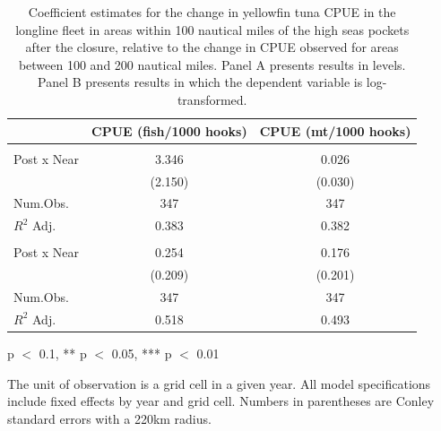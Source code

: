 \begin{table}
\centering
\begin{threeparttable}
\small
\caption{\label{tab:h3_reg_yft_ll}Coefficient estimates for the change in yellowfin tuna CPUE in the longline fleet in
             areas within 100 nautical miles of the high seas pockets after the closure, relative to the change in CPUE
             observed for areas between 100 and 200 nautical miles.
             Panel A presents results in levels. Panel B presents results in which the dependent variable is log-transformed.}
\centering
\begin{tabular}[t]{lcc}
\toprule
  & CPUE (fish/1000 hooks) & CPUE (mt/1000 hooks)\\
\midrule
\addlinespace[0.5em]
\multicolumn{3}{l}{\textit{A) Levels}}\\
\midrule \hspace{1em}Post x Near & 3.346 & 0.026\\
\hspace{1em} & (2.150) & (0.030)\\
\hspace{1em}Num.Obs. & 347 & \vphantom{1} 347\\
\hspace{1em}$R^2$ Adj. & 0.383 & 0.382\\
\addlinespace[0.5em]
\multicolumn{3}{l}{\textit{B) Log-transformed}}\\
\midrule \hspace{1em}Post x Near & 0.254 & 0.176\\
\hspace{1em} & (0.209) & (0.201)\\
\hspace{1em}Num.Obs. & 347 & 347\\
\hspace{1em}$R^2$ Adj. & 0.518 & 0.493\\
\bottomrule
\end{tabular}
\begin{tablenotes}
\small
\item * p $<$ 0.1, ** p $<$ 0.05, *** p $<$ 0.01
\item The unit of observation is a grid cell in a given year. All model specifications include fixed effects by year and grid cell. Numbers in parentheses are Conley standard errors with a 220km radius.
\end{tablenotes}
\end{threeparttable}
\end{table}
